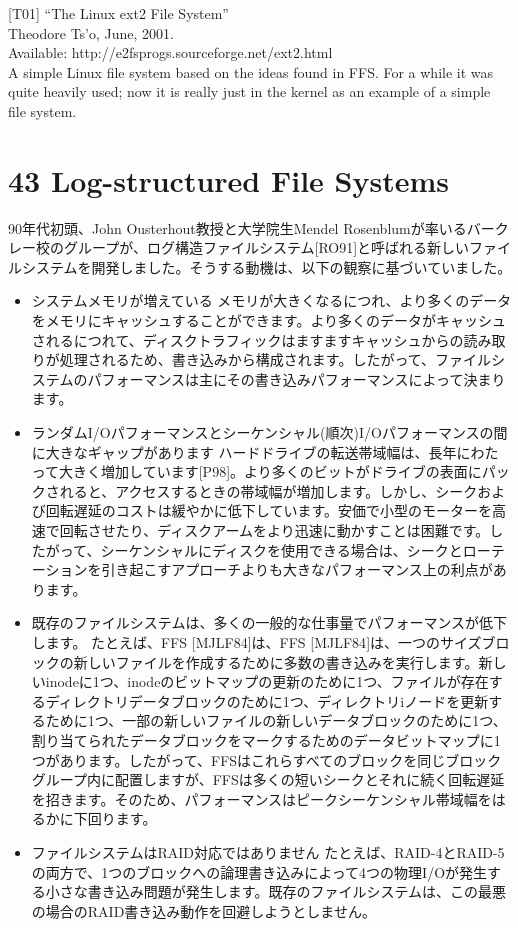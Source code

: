 {[}T01{]} ``The Linux ext2 File System''\\
Theodore Ts'o, June, 2001.\\
Available: http://e2fsprogs.sourceforge.net/ext2.html\\
A simple Linux file system based on the ideas found in FFS. For a while
it was quite heavily used; now it is really just in the kernel as an
example of a simple file system.

\newpage

\hypertarget{log-structured-file-systems}{%
\section*{43 Log-structured File
Systems}\label{log-structured-file-systems}}

90年代初頭、John Ousterhout教授と大学院生Mendel
Rosenblumが率いるバークレー校のグループが、ログ構造ファイルシステム{[}RO91{]}と呼ばれる新しいファイルシステムを開発しました。そうする動機は、以下の観察に基づいていました。

\begin{itemize}
\item
  システムメモリが増えている
  メモリが大きくなるにつれ、より多くのデータをメモリにキャッシュすることができます。より多くのデータがキャッシュされるにつれて、ディスクトラフィックはますますキャッシュからの読み取りが処理されるため、書き込みから構成されます。したがって、ファイルシステムのパフォーマンスは主にその書き込みパフォーマンスによって決まります。
\item
  ランダムI/Oパフォーマンスとシーケンシャル(順次)I/Oパフォーマンスの間に大きなギャップがあります
  ハードドライブの転送帯域幅は、長年にわたって大きく増加しています{[}P98{]}。より多くのビットがドライブの表面にパックされると、アクセスするときの帯域幅が増加します。しかし、シークおよび回転遅延のコストは緩やかに低下しています。安価で小型のモーターを高速で回転させたり、ディスクアームをより迅速に動かすことは困難です。したがって、シーケンシャルにディスクを使用できる場合は、シークとローテーションを引き起こすアプローチよりも大きなパフォーマンス上の利点があります。
\item
  既存のファイルシステムは、多くの一般的な仕事量でパフォーマンスが低下します。
  たとえば、FFS {[}MJLF84{]}は、FFS
  {[}MJLF84{]}は、一つのサイズブロックの新しいファイルを作成するために多数の書き込みを実行します。新しいinodeに1つ、inodeのビットマップの更新のために1つ、ファイルが存在するディレクトリデータブロックのために1つ、ディレクトリiノードを更新するために1つ、一部の新しいファイルの新しいデータブロックのために1つ、割り当てられたデータブロックをマークするためのデータビットマップに1つがあります。したがって、FFSはこれらすべてのブロックを同じブロックグループ内に配置しますが、FFSは多くの短いシークとそれに続く回転遅延を招きます。そのため、パフォーマンスはピークシーケンシャル帯域幅をはるかに下回ります。
\item
  ファイルシステムはRAID対応ではありません
  たとえば、RAID-4とRAID-5の両方で、1つのブロックへの論理書き込みによって4つの物理I/Oが発生する小さな書き込み問題が発生します。既存のファイルシステムは、この最悪の場合のRAID書き込み動作を回避しようとしません。
\end{itemize}

